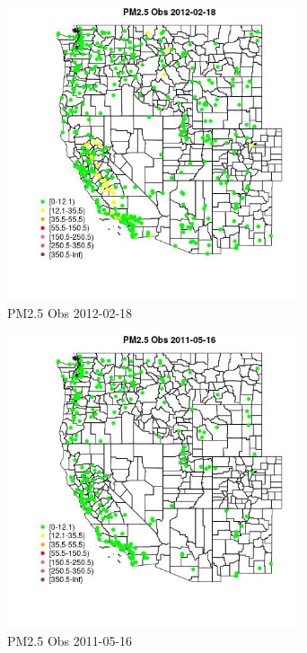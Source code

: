 \begin{figure} 
\centering  
\includegraphics[width=0.77\textwidth]{Code_Outputs/Report_ML_input_PM25_Step4_part_f_de_duplicated_aveswNAs_MapObsPM25_Obs2012-02-18.jpg} 
\caption{\label{fig:Report_ML_input_PM25_Step4_part_f_de_duplicated_aveswNAsMapObsPM25_Obs2012-02-18}PM2.5 Obs 2012-02-18} 
\end{figure} 
 

\begin{figure} 
\centering  
\includegraphics[width=0.77\textwidth]{Code_Outputs/Report_ML_input_PM25_Step4_part_f_de_duplicated_aveswNAs_MapObsPM25_Obs2011-05-16.jpg} 
\caption{\label{fig:Report_ML_input_PM25_Step4_part_f_de_duplicated_aveswNAsMapObsPM25_Obs2011-05-16}PM2.5 Obs 2011-05-16} 
\end{figure} 
 

